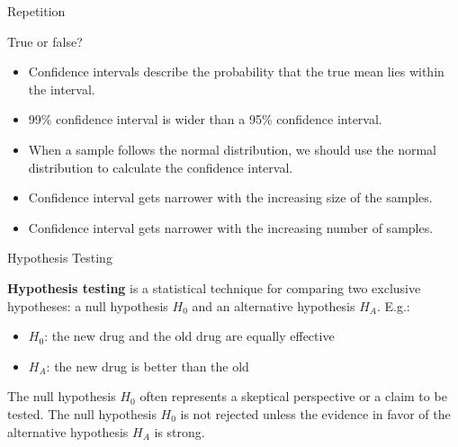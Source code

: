 \begin{frame}{Repetition}

    \begin{example}
        \medskip
        True or false?
        \begin{itemize}
            \item Confidence intervals describe the probability that the true mean lies within the interval.
            \item 99\% confidence interval is wider than a 95\% confidence interval.
            \item When a sample follows the normal distribution, we should use the normal distribution to calculate the confidence interval.
            \item Confidence interval gets narrower with the increasing size of the samples.
            \item Confidence interval gets narrower with the increasing number of samples.
        \end{itemize}
    \end{example}

\end{frame}

\begin{frame}{Hypothesis Testing}

    \textbf{Hypothesis testing} is a statistical technique for comparing two exclusive hypotheses: a null hypothesis $H_0$ and an alternative hypothesis $H_A$. E.g.:
    \begin{itemize}
        \item $H_0$: the new drug and the old drug are equally effective
        \item $H_A$: the new drug is better than the old
    \end{itemize}

    The null hypothesis $H_0$ often represents a skeptical perspective or a claim to be tested. The null hypothesis $H_0$ is not rejected unless the evidence in favor of the alternative hypothesis $H_A$ is strong.

\end{frame}


